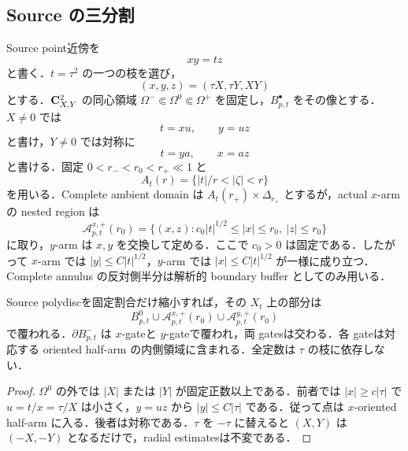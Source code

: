 \documentclass[a4paper,11pt]{ltjsarticle}
\numberwithin{equation}{section}
\theoremstyle{plain}
\theoremstyle{definition}
\theoremstyle{remark}
\newcommand{\cA}{\mathcal A}\newcommand{\cM}{\mathcal M}\newcommand{\cE}{\mathcal E}\newcommand{\cU}{\mathcal U}\newcommand{\cR}{\mathcal R}
\begin{document}
\subsection{Source の三分割}
Source point近傍を
\begin{equation}\label{coarse:eq:source-model}
 xy=tz
\end{equation}
と書く．$t=\tau^2$ の一つの枝を選び，
\begin{equation}\label{coarse:eq:source-rescaling}
 (x,y,z)=(\tau X,\tau Y,XY)
\end{equation}
とする．$\mathbf C^2_{X,Y}$ の同心領域 $\Omega^-\Subset\Omega^0\Subset\Omega^+$ を固定し，$B_{p,t}^\bullet$ をその像とする．$X\ne0$ では
\begin{equation}\label{coarse:eq:x-arm}
 t=xu,\qquad y=uz
\end{equation}
と書け，$Y\ne0$ では対称に
\begin{equation}\label{coarse:eq:y-arm}
 t=ya,\qquad x=az
\end{equation}
と書ける．固定 $0<r_-<r_0<r_+\ll1$ と
\[
 A_t(r)=\{|t|/r<|\zeta|<r\}
\]
を用いる．Complete ambient domain は $A_t(r_+)\times\Delta_{r_+}$ とするが，actual $x$-arm の nested region は
\[
 \cA_{p,t}^{x,+}(r_0)
 =\{(x,z):c_0|t|^{1/2}\le |x|\le r_0,
       \ |z|\le r_0\}
\]
に取り，$y$-arm は $x,y$ を交換して定める．ここで $c_0>0$ は固定である．したがって $x$-arm では
$|y|\le C|t|^{1/2}$，$y$-arm では $|x|\le C|t|^{1/2}$ が一様に成り立つ．Complete annulus の反対側半分は解析的 boundary buffer としてのみ用いる．

\begin{lemma}\label{coarse:lem:source-trichotomy}
Source polydiscを固定割合だけ縮小すれば，その $X_t$ 上の部分は
\[
 B_{p,t}^0\cup\cA_{p,t}^{x,+}(r_0)\cup\cA_{p,t}^{y,+}(r_0)
\]
で覆われる．$\partial B_{p,t}^-$ は $x$-gateと $y$-gateで覆われ，両 gatesは交わる．各 gateは対応する oriented half-arm の内側領域に含まれる．全定数は $\tau$ の枝に依存しない．
\end{lemma}

\begin{proof}
$\Omega^0$ の外では $|X|$ または $|Y|$ が固定正数以上である．前者では $|x|\ge c|\tau|$ で
$u=t/x=\tau/X$ は小さく，$y=uz$ から $|y|\le C|\tau|$ である．従って点は $x$-oriented half-arm に入る．後者は対称である．$\tau$ を $-\tau$ に替えると $(X,Y)$ は $(-X,-Y)$ となるだけで，radial estimatesは不変である．
\end{proof}
\end{document}

